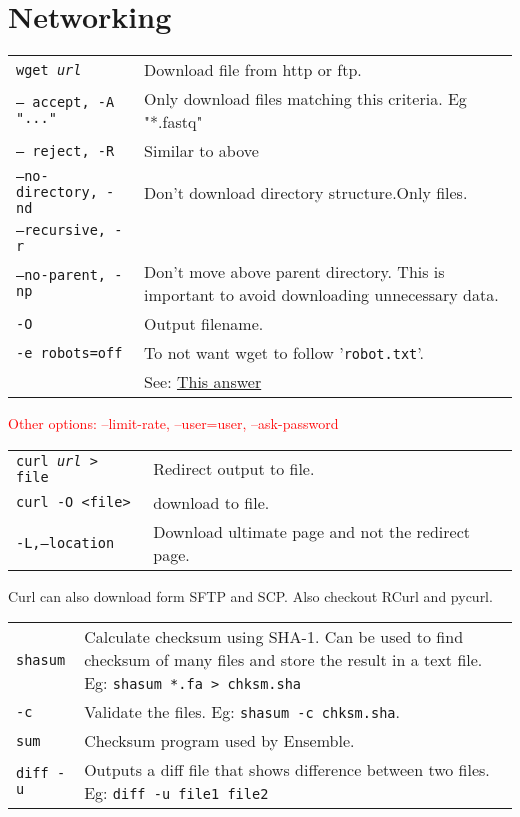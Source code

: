 \section{Networking}

\begin{tabularx}{\linewidth}{lX}
\hline
\texttt{wget \textit{url}} & Download file from http or ftp.\\
\texttt{-- accept, -A "..."} & Only download files matching this criteria. Eg "*.fastq"\\
\texttt{-- reject, -R} & Similar to above\\
\texttt{--no-directory, -nd} & Don't download directory structure.Only files.\\
\texttt{--recursive, -r} & \\
\texttt{--no-parent, -np} & Don't move above parent directory. This is important to avoid downloading unnecessary data.\\
\texttt{-O} & Output filename.\\
\texttt{-e robots=off} & To not want wget to follow '\texttt{robot.txt}'.\\
& See: \href{https://stackoverflow.com/a/11124664}{This answer} \\
\hline
\end{tabularx}

\textcolor{red}{Other options: --limit-rate, --user=user, --ask-password}\\


\begin{tabularx}{\linewidth}{lX}
\hline
\texttt{curl \textit{url} > file} & Redirect output to file.\\
\texttt{curl -O <file>} & download to file.\\
\texttt{-L,--location} & Download ultimate page and not the redirect page.\\
\hline
\end{tabularx}
Curl can also download form SFTP and SCP. Also checkout RCurl and pycurl.

\begin{tabularx}{\linewidth}{lX}
\hline
\texttt{shasum} & Calculate checksum using SHA-1. Can be used to find checksum of many files and store the result in a text file. Eg: \texttt{shasum *.fa > chksm.sha}\\
\texttt{-c} & Validate the files. Eg: \texttt{shasum -c chksm.sha}.\\
\texttt{sum} & Checksum program used by Ensemble.\\
\texttt{diff -u} & Outputs a diff file that shows difference between two files. Eg: \texttt{diff -u file1 file2}\\
\hline
\end{tabularx}

